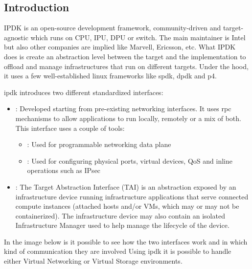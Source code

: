 \documentclass[../sn.tex]{subfiles}
\begin{document}
\subsection{Introduction}
IPDK is an open-source development framework, community-driven and target-agnostic which runs on CPU, IPU, DPU or switch.
The main maintainer is Intel but also other companies are implied like Marvell, Ericsson, etc.
What IPDK does is create an abstraction level between the target and the implementation to offload and manage infrastructures that run on different targets.
Under the hood, it uses a few well-established linux frameworks like \acrshort{spdk}, \acrshort{dpdk} and \acrshort{p4}.

\acrshort{ipdk} introduces two different standardized interfaces:
\begin{itemize}
    \item {}: Developed starting from pre-existing networking interfaces. It uses \acrshort{rpc} mechanisms to allow applications to run locally, remotely or a mix of both. This interface uses a couple of tools:
        \begin{itemize}
            \item {}: Used for programmable networking data plane
            \item {}: Used for configuring physical ports, virtual devices, QoS and inline operations such as IPsec
        \end{itemize}
    \item {}: The Target Abstraction Interface (TAI) is an abstraction exposed by an infrastructure device running infrastructure applications that serve connected compute instances (attached hosts and/or VMs, which may or may not be containerized).
    The infrastructure device may also contain an isolated Infrastructure Manager used to help manage the lifecycle of the device.
\end{itemize}
In the image below is it possible to see how the two interfaces work and in which kind of communication they are involved
Using \acrshort{ipdk} it is possible to handle either Virtual Networking or Virtual Storage environments.
\end{document}
